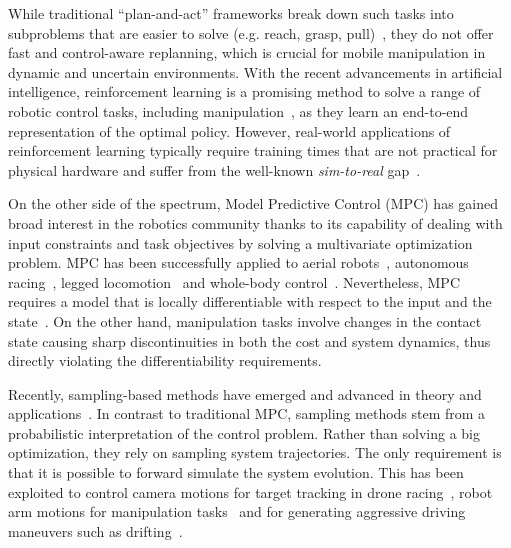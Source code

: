 While traditional ``plan-and-act'' frameworks break down such tasks into subproblems that are easier to solve (e.g. reach, grasp, pull)~\cite{Murali2020}, they do not offer fast and control-aware replanning, which is crucial for mobile manipulation in dynamic and uncertain environments. 
With the recent advancements in artificial intelligence, reinforcement learning is a promising method to solve a range of robotic control tasks, including manipulation~\cite{finn2016deep}, as they learn an end-to-end representation of the optimal policy. However, real-world applications of reinforcement learning typically require training times that are not practical for physical hardware and suffer from the well-known \emph{sim-to-real} gap~\cite{chebotar2019closing}. 

On the other side of the spectrum, Model Predictive Control (MPC) has gained broad interest in the robotics community thanks to its capability of dealing with input constraints and task objectives by solving a multivariate optimization problem. 
MPC has been successfully applied to aerial robots~\cite{brunner2020trajectory}, autonomous racing~\cite{liniger2015optimization}, legged locomotion~\cite{grandia2019frequency} and whole-body control~\cite{minniti2019whole}. Nevertheless, MPC requires a model that is locally differentiable with respect to the input and the state~\cite{buchli2017optimal}. On the other hand, manipulation tasks involve changes in the contact state causing sharp discontinuities in both the cost and system dynamics, thus directly violating the differentiability requirements. 

Recently, sampling-based methods have emerged and advanced in theory and applications~\cite{lee_aggressive_2020,abraham_model-based_2020,rajamaki_augmenting_2017}. 
In contrast to traditional MPC, sampling methods stem from a probabilistic interpretation of the control problem. 
Rather than solving a big optimization, they rely on sampling system trajectories. The only requirement is that it is possible to forward simulate the system evolution. This has been exploited to control camera motions for target tracking in drone racing~\cite{lee_aggressive_2020}, robot arm motions for manipulation tasks~\cite{abraham_model-based_2020} and for generating aggressive driving maneuvers such as drifting~\cite{williams_information_2017}. 


